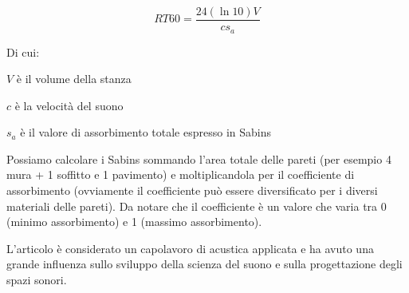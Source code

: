 \begin{equation}
RT60 = \frac{24(\ln{10})V}{c s_a}
\end{equation}

Di cui:
\begin{compactitem}
\item $V$ è il volume della stanza
\item $c$ è la velocità del suono
\item $s_a$ è il valore di assorbimento totale espresso in Sabins
\end{compactitem}

Possiamo calcolare i Sabins sommando l’area totale delle pareti (per esempio 4 mura + 1 soffitto e 1 pavimento) e moltiplicandola per il coefficiente di assorbimento (ovviamente il coefficiente può essere diversificato per i diversi materiali delle pareti). Da notare che il coefficiente è un valore che varia tra 0 (minimo assorbimento) e 1 (massimo assorbimento).

L’articolo è considerato un capolavoro di acustica applicata e ha avuto una grande influenza sullo sviluppo della scienza del suono e sulla progettazione degli spazi sonori.
